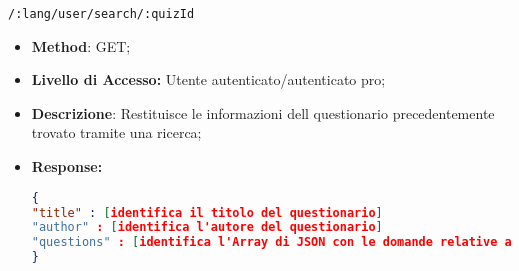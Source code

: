 	 
	\item \texttt{/:lang/user/search/:quizId}
	\begin{itemize}
		\item \textbf{Method}: GET;
		\item \textbf{Livello di Accesso:} Utente autenticato/autenticato pro;
		\item \textbf{Descrizione}: Restituisce le informazioni dell questionario precedentemente trovato tramite una ricerca;
		\item \textbf{Response:} 
\begin{lstlisting}[language=json,firstnumber=1]
{
"title" : [identifica il titolo del questionario]
"author" : [identifica l'autore del questionario]
"questions" : [identifica l'Array di JSON con le domande relative al questionario]
}
\end{lstlisting}
	\end{itemize}